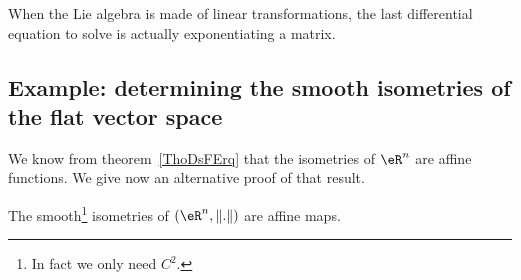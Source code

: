 \begin{remark}
	When the Lie algebra is made of linear transformations, the last differential equation to solve is actually exponentiating a matrix.
\end{remark}

\subsection{Example: determining the smooth isometries of the flat vector space}

We know from theorem~\ref{ThoDsFErq} that the isometries of \( \eR^n\) are affine functions. We give now an alternative proof of that result.

\begin{proposition}     \label{PROPooDVIWooAFDNPy}
	The smooth\footnote{In fact we only need \( C^2\).} isometries of \( (\eR^n,\| . \|)  \)  are affine maps.
\end{proposition}

